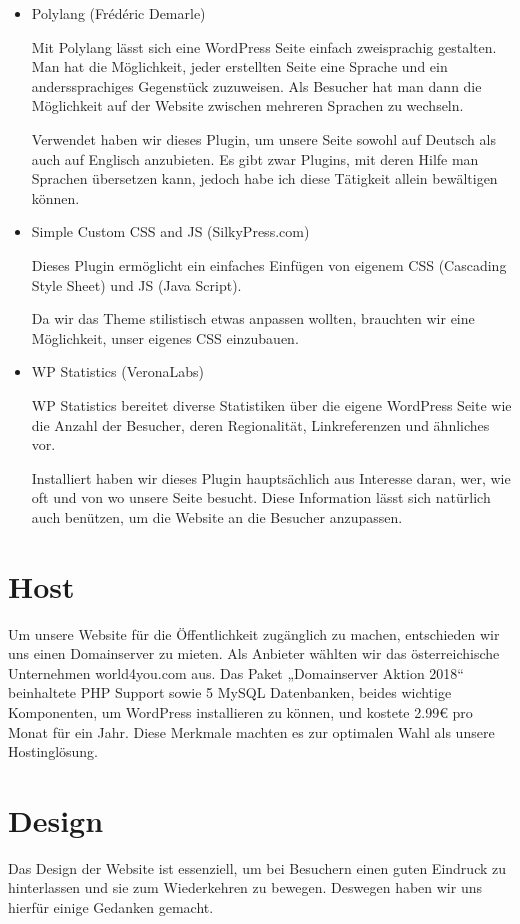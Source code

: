 \begin{itemize}
    \item Polylang (Frédéric Demarle) \citep{website:Polylang}

    Mit Polylang lässt sich eine WordPress Seite einfach zweisprachig gestalten. Man hat die Möglichkeit, jeder erstellten Seite eine Sprache und ein anderssprachiges Gegenstück zuzuweisen. Als Besucher hat man dann die Möglichkeit auf der Website zwischen mehreren Sprachen zu wechseln.

    Verwendet haben wir dieses Plugin, um unsere Seite sowohl auf Deutsch als auch auf Englisch anzubieten. Es gibt zwar Plugins, mit deren Hilfe man Sprachen übersetzen kann, jedoch habe ich diese Tätigkeit allein bewältigen können.

    \item Simple Custom CSS and JS (SilkyPress.com) \citep{website:SimpleCustomCSSJS}

    Dieses Plugin ermöglicht ein einfaches Einfügen von eigenem CSS (Cascading Style Sheet) und JS (Java Script).

    Da wir das Theme stilistisch etwas anpassen wollten, brauchten wir eine Möglichkeit, unser eigenes CSS einzubauen.

    \item WP Statistics (VeronaLabs) \citep{website:WPStats}

    WP Statistics bereitet diverse Statistiken über die eigene WordPress Seite wie die Anzahl der Besucher, deren Regionalität, Linkreferenzen und ähnliches vor.

    Installiert haben wir dieses Plugin hauptsächlich aus Interesse daran, wer, wie oft und von wo unsere Seite besucht. Diese Information lässt sich natürlich auch benützen, um die Website an die Besucher anzupassen.
\end{itemize}
\section{Host}
Um unsere Website für die Öffentlichkeit zugänglich zu machen, entschieden wir uns einen Domainserver zu mieten. Als Anbieter wählten wir das österreichische Unternehmen world4you.com aus. Das Paket „Domainserver Aktion 2018“ beinhaltete PHP Support sowie 5 MySQL Datenbanken, beides wichtige Komponenten, um WordPress installieren zu können, und kostete 2.99€ pro Monat für ein Jahr. Diese Merkmale machten es zur optimalen Wahl als unsere Hostinglösung. \citep{website:Host}
\section{Design}
Das Design der Website ist essenziell, um bei Besuchern einen guten Eindruck zu hinterlassen und sie zum Wiederkehren zu bewegen. Deswegen haben wir uns hierfür einige Gedanken gemacht.
